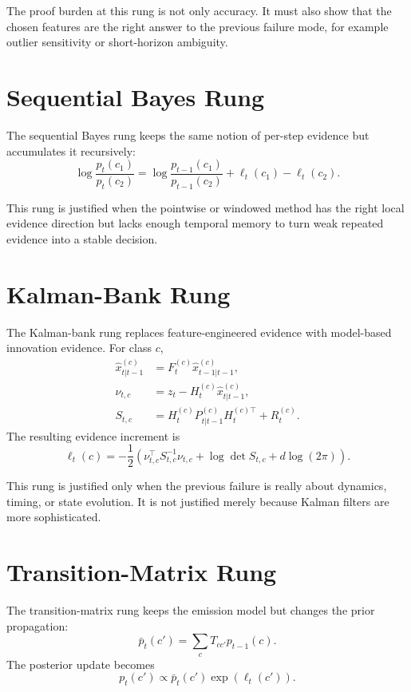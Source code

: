 \documentclass[11pt]{article}
\begin{document}
The proof burden at this rung is not only accuracy. It must also show that the chosen features are the right answer to the previous failure mode, for example outlier sensitivity or short-horizon ambiguity.

\section{Sequential Bayes Rung}
The sequential Bayes rung keeps the same notion of per-step evidence but accumulates it recursively:
\begin{equation}
\log \frac{p_t(c_1)}{p_t(c_2)}
=
\log \frac{p_{t-1}(c_1)}{p_{t-1}(c_2)}
+
\ell_t(c_1) - \ell_t(c_2).
\end{equation}

This rung is justified when the pointwise or windowed method has the right local evidence direction but lacks enough temporal memory to turn weak repeated evidence into a stable decision.

\section{Kalman-Bank Rung}
The Kalman-bank rung replaces feature-engineered evidence with model-based innovation evidence. For class \(c\),
\begin{align}
\hat{x}_{t|t-1}^{(c)} &= F_t^{(c)} \hat{x}_{t-1|t-1}^{(c)}, \\
\nu_{t,c} &= z_t - H_t^{(c)} \hat{x}_{t|t-1}^{(c)}, \\
S_{t,c} &= H_t^{(c)} P_{t|t-1}^{(c)} H_t^{(c)\top} + R_t^{(c)}.
\end{align}
The resulting evidence increment is
\begin{equation}
\ell_t(c)
=
-\frac{1}{2}
\left(
\nu_{t,c}^{\top} S_{t,c}^{-1} \nu_{t,c}
+ \log \det S_{t,c}
+ d \log(2\pi)
\right).
\end{equation}

This rung is justified only when the previous failure is really about dynamics, timing, or state evolution. It is not justified merely because Kalman filters are more sophisticated.

\section{Transition-Matrix Rung}
The transition-matrix rung keeps the emission model but changes the prior propagation:
\begin{equation}
\bar{p}_t(c') = \sum_c T_{cc'} p_{t-1}(c).
\end{equation}
The posterior update becomes
\begin{equation}
p_t(c')
\propto
\bar{p}_t(c') \exp(\ell_t(c')).
\end{equation}
\end{document}
